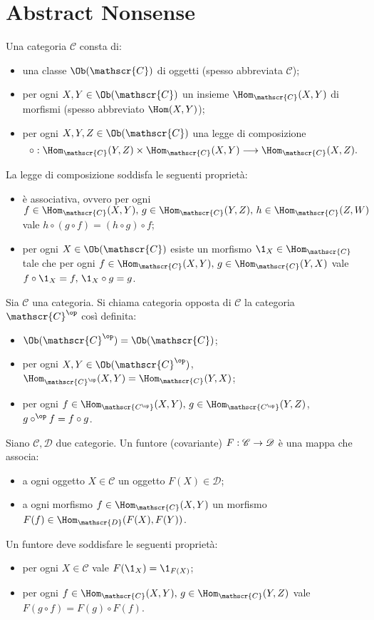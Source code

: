\section{Abstract Nonsense}
\begin{definition}
Una categoria $\mathscr{C}$ consta di:
\begin{itemize}
\item una classe $\Ob(\mathscr{C})$ di oggetti (spesso abbreviata $\mathscr{C}$);
\item per ogni $X,Y\in\Ob(\mathscr{C})$ un insieme $\Hom_{\mathscr{C}}(X,Y)$ di morfismi (spesso abbreviato $\Hom(X,Y)$);
\item per ogni $X,Y,Z\in\Ob(\mathscr{C})$ una legge di composizione
$$
\circ:\Hom_{\mathscr{C}}(Y,Z)\times\Hom_{\mathscr{C}}(X,Y)\longrightarrow\Hom_{\mathscr{C}}(X,Z).
$$
\end{itemize}
La legge di composizione soddisfa le seguenti proprietà:
\begin{itemize}
\item è associativa, ovvero per ogni $f\in\Hom_\mathscr{C}(X,Y)\comma g\in\Hom_\mathscr{C}(Y,Z)\comma h\in\Hom_\mathscr{C}(Z,W)$ vale $h\circ(g\circ f)=(h\circ g)\circ f$;
\item per ogni $X\in\Ob(\mathscr{C})$ esiste un morfismo $\1_X\in\Hom_{\mathscr{C}}$ tale che per ogni $f\in\Hom_\mathscr{C}(X,Y)\comma g\in\Hom_\mathscr{C}(Y,X)$ vale $f\circ\1_X=f\comma\1_X\circ g=g$.
\end{itemize}
\end{definition}
\begin{definition}
Sia $\mathscr{C}$ una categoria. Si chiama categoria opposta di $\mathscr{C}$ la categoria $\mathscr{C}^{\op}$ così definita:
\begin{itemize}
\item $\Ob(\mathscr{C}^{\op})=\Ob(\mathscr{C})$;
\item per ogni $X,Y\in\Ob(\mathscr{C}^{\op})$, $\Hom_{\mathscr{C}^{\op}}(X,Y)=\Hom_{\mathscr{C}}(Y,X)$;
\item per ogni $f\in\Hom_\mathscr{C^{\op}}(X,Y)\comma g\in\Hom_\mathscr{C^{\op}}(Y,Z)$, $g\circ^{\op}f=f\circ g$.
\end{itemize}
\end{definition}
\begin{definition}
Siano $\mathscr{C},\mathscr{D}$ due categorie. Un funtore (covariante) $F:\mathscr{C}\rightarrow \mathscr{D}$ è una mappa che associa:
\begin{itemize}
\item a ogni oggetto $X\in\mathscr{C}$ un oggetto $F(X)\in\mathscr{D}$;
\item a ogni morfismo $f\in\Hom_\mathscr{C}(X,Y)$ un morfismo $F(f)\in\Hom_\mathscr{D}(F(X),F(Y))$.
\end{itemize}
Un funtore deve soddisfare le seguenti proprietà:
\begin{itemize}
\item per ogni $X\in\mathscr{C}$ vale $F(\1_X)=\1_{F(X)}$;
\item per ogni $f\in\Hom_\mathscr{C}(X,Y)\comma g\in\Hom_\mathscr{C}(Y,Z)$ vale $F(g\circ f)=F(g)\circ F(f)$.
\end{itemize}
\end{definition}
